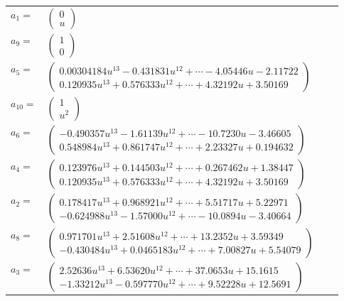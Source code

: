 \documentclass[1p]{elsarticle_modified}
\theoremstyle{definition}
\begin{document}
\begin{tabular}{m{7pt} m{180pt} m{7pt} m{180pt} }
\flushright $a_{1}=$&$\begin{pmatrix}0\\u\end{pmatrix}$ \\
\flushright $a_{9}=$&$\begin{pmatrix}1\\0\end{pmatrix}$ \\
\flushright $a_{5}=$&$\begin{pmatrix}0.00304184 u^{13}-0.431831 u^{12}+\cdots-4.05446 u-2.11722\\0.120935 u^{13}+0.576333 u^{12}+\cdots+4.32192 u+3.50169\end{pmatrix}$ \\
\flushright $a_{10}=$&$\begin{pmatrix}1\\u^2\end{pmatrix}$ \\
\flushright $a_{6}=$&$\begin{pmatrix}-0.490357 u^{13}-1.61139 u^{12}+\cdots-10.7230 u-3.46605\\0.548984 u^{13}+0.861747 u^{12}+\cdots+2.23327 u+0.194632\end{pmatrix}$ \\
\flushright $a_{4}=$&$\begin{pmatrix}0.123976 u^{13}+0.144503 u^{12}+\cdots+0.267462 u+1.38447\\0.120935 u^{13}+0.576333 u^{12}+\cdots+4.32192 u+3.50169\end{pmatrix}$ \\
\flushright $a_{2}=$&$\begin{pmatrix}0.178417 u^{13}+0.968921 u^{12}+\cdots+5.51717 u+5.22971\\-0.624988 u^{13}-1.57000 u^{12}+\cdots-10.0894 u-3.40664\end{pmatrix}$ \\
\flushright $a_{8}=$&$\begin{pmatrix}0.971701 u^{13}+2.51608 u^{12}+\cdots+13.2352 u+3.59349\\-0.430484 u^{13}+0.0465183 u^{12}+\cdots+7.00827 u+5.54079\end{pmatrix}$ \\
\flushright $a_{3}=$&$\begin{pmatrix}2.52636 u^{13}+6.53620 u^{12}+\cdots+37.0653 u+15.1615\\-1.33212 u^{13}-0.597770 u^{12}+\cdots+9.52228 u+12.5691\end{pmatrix}$ \\

\end{tabular}
\end{document}
